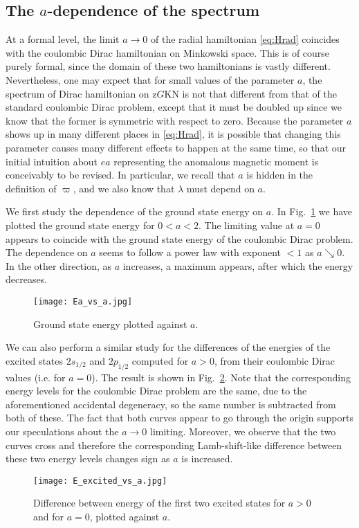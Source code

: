 \documentclass[11 pt]{article}
\renewcommand\({\left(}
\renewcommand\){\right)}
\newcommand\<{\langle}
\renewcommand\>{\rangle}
\newcommand\8{\infty}
\begin{document}
\subsection{The $a$-dependence of the spectrum}
At a formal level, the limit $a\to 0$ of the radial hamiltonian \eqref{eq:Hrad} coincides with the coulombic Dirac hamiltonian on Minkowski space.  This is of course purely formal, since the domain of these two hamiltonians is vastly different.  Nevertheless, one may expect that for small values of the parameter $a$, the spectrum of Dirac hamiltonian on z$G$KN is not that different from that of the standard coulombic Dirac problem, except that it must be doubled up since we know that the former is symmetric with respect to zero.  Because the parameter $a$ shows up in many different places in \eqref{eq:Hrad}, it is possible that changing this parameter causes many different effects to happen at the same time, so that our initial intuition
about $ea$ representing the anomalous magnetic moment is conceivably to be revised.  
 In particular, we recall that $a$ is hidden in the definition of $\varpi$, and we also know that $\lambda$ must depend on $a$.

We first study the dependence of the ground state energy on $a$.  In Fig.~\ref{fig:Evsa} we have plotted the ground state energy for $0<a<2$. The limiting value at $a=0$ appears to coincide with the ground state energy of the coulombic Dirac problem.  The dependence on $a$ seems to follow a power law with exponent $< 1$ as $a \searrow 0$. In the other direction, as $a$ increases, a maximum appears, after which the energy decreases.   %
\begin{figure}[h!]
\centering
\texttt{[image: Ea\_vs\_a.jpg]}
\caption{Ground state energy plotted against $a$.}
\label{fig:Evsa}
\end{figure}
We can also perform a similar study for the differences of the energies of the excited states $2s_{1/2}$ and $2p_{1/2}$ computed for $a>0$, from their coulombic Dirac values (i.e. for $a=0$).  The result is shown in Fig.~\ref{fig:exciteda}. Note that the corresponding energy levels for the coulombic Dirac problem are the same, due to the aforementioned  accidental degeneracy, so the same number is subtracted from both of these.   The fact that both curves appear to go through the origin supports our speculations about the $a\to 0$ limiting.  Moreover, we observe that the two curves cross and therefore the corresponding Lamb-shift-like difference between these two energy levels changes sign as $a$ is increased.
\begin{figure}[h!]
\centering
\texttt{[image: E\_excited\_vs\_a.jpg]}
\caption{Difference between energy of the first two excited states for $a>0$ and for $a=0$, plotted against $a$.}
\label{fig:exciteda}
\end{figure}
\end{document}
